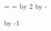 



\def\vdecor{\hskip\hmargin plus1fil%
  \vbox to \vsize{\hbox to \barwidth{\vrule height\barheight width\barwidth}%
  \vfill
  \hbox to \barwidth{\vrule height\barheight width\barwidth}}%
  \hskip\hmargin plus1fil}



\newdimen\fullhsize          %
\newdimen\itmwid             %
\newdimen\dfnwid             %
\newdimen\idnwid             %
\newdimen\temp               %


\newdimen\altitmwid        %
\newdimen\altdfnwid        %

%

\fullhsize=\totalwidth
\temp=\hmargin
\multiply \temp by 2
\advance \fullhsize by -\temp



\newcount\tmpcnt
\tmpcnt\columnsperpage
\advance \tmpcnt by -1

